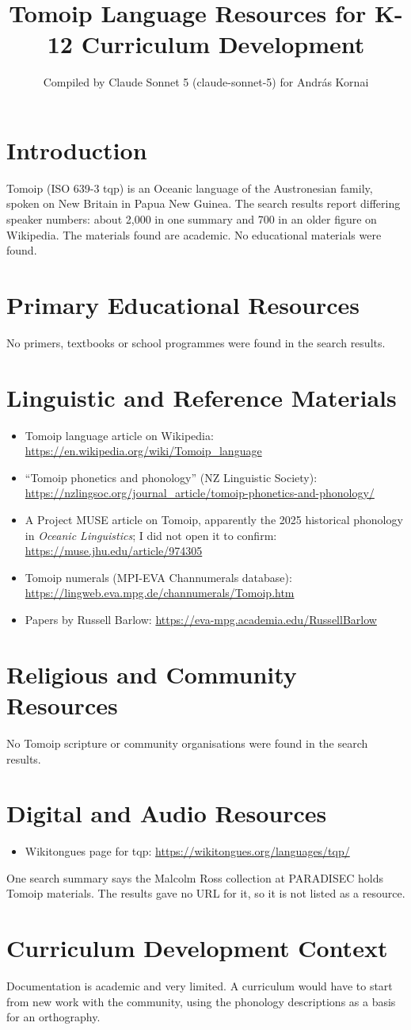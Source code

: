 \documentclass[12pt]{article}
\title{Tomoip Language Resources for K-12 Curriculum Development}
\author{Compiled by Claude Sonnet 5 (claude-sonnet-5) for Andr\'as Kornai}
\date{}
\begin{document}
\maketitle

\section{Introduction}
Tomoip (ISO 639-3 tqp) is an Oceanic language of the Austronesian family, spoken on New Britain in Papua New Guinea. The search results report differing speaker numbers: about 2,000 in one summary and 700 in an older figure on Wikipedia. The materials found are academic. No educational materials were found.

\section{Primary Educational Resources}
No primers, textbooks or school programmes were found in the search results.

\section{Linguistic and Reference Materials}
\begin{itemize}
\item Tomoip language article on Wikipedia: \url{https://en.wikipedia.org/wiki/Tomoip_language}
\item ``Tomoip phonetics and phonology'' (NZ Linguistic Society): \url{https://nzlingsoc.org/journal_article/tomoip-phonetics-and-phonology/}
\item A Project MUSE article on Tomoip, apparently the 2025 historical phonology in \emph{Oceanic Linguistics}; I did not open it to confirm: \url{https://muse.jhu.edu/article/974305}
\item Tomoip numerals (MPI-EVA Channumerals database): \url{https://lingweb.eva.mpg.de/channumerals/Tomoip.htm}
\item Papers by Russell Barlow: \url{https://eva-mpg.academia.edu/RussellBarlow}
\end{itemize}

\section{Religious and Community Resources}
No Tomoip scripture or community organisations were found in the search results.

\section{Digital and Audio Resources}
\begin{itemize}
\item Wikitongues page for tqp: \url{https://wikitongues.org/languages/tqp/}
\end{itemize}
One search summary says the Malcolm Ross collection at PARADISEC holds Tomoip materials. The results gave no URL for it, so it is not listed as a resource.

\section{Curriculum Development Context}
Documentation is academic and very limited. A curriculum would have to start from new work with the community, using the phonology descriptions as a basis for an orthography.
\end{document}
